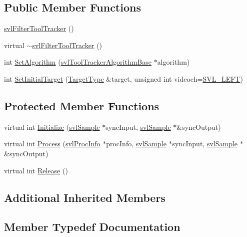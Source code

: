 \subsection*{Public Member Functions}
\begin{DoxyCompactItemize}
\item 
\hyperlink{classsvl_filter_tool_tracker_a442bd4bbe942d63139f1728da7247a30}{svl\+Filter\+Tool\+Tracker} ()
\item 
virtual \hyperlink{classsvl_filter_tool_tracker_a887c017972cd0ca96503fb6c4bd77ed0}{$\sim$svl\+Filter\+Tool\+Tracker} ()
\item 
int \hyperlink{classsvl_filter_tool_tracker_a6deaa24cb8bc7e37f128800e5ce4ac97}{Set\+Algorithm} (\hyperlink{classsvl_tool_tracker_algorithm_base}{svl\+Tool\+Tracker\+Algorithm\+Base} $\ast$algorithm)
\item 
int \hyperlink{classsvl_filter_tool_tracker_a4ce5ff7a3efe30b0347dab41b39dda38}{Set\+Initial\+Target} (\hyperlink{classsvl_filter_tool_tracker_a3fe48b9f9a53caf0f5df9e96b1ccc38e}{Target\+Type} \&target, unsigned int videoch=\hyperlink{svl_definitions_8h_ab9fec7615f19c8df2919eebcab0b187f}{S\+V\+L\+\_\+\+L\+E\+F\+T})
\end{DoxyCompactItemize}
\subsection*{Protected Member Functions}
\begin{DoxyCompactItemize}
\item 
virtual int \hyperlink{classsvl_filter_tool_tracker_ad71ff49f9538f8f34ef57deb1d8f34a6}{Initialize} (\hyperlink{classsvl_sample}{svl\+Sample} $\ast$sync\+Input, \hyperlink{classsvl_sample}{svl\+Sample} $\ast$\&sync\+Output)
\item 
virtual int \hyperlink{classsvl_filter_tool_tracker_a33c461cf76f3c09f50493a98bdb9dd6e}{Process} (\hyperlink{structsvl_proc_info}{svl\+Proc\+Info} $\ast$proc\+Info, \hyperlink{classsvl_sample}{svl\+Sample} $\ast$sync\+Input, \hyperlink{classsvl_sample}{svl\+Sample} $\ast$\&sync\+Output)
\item 
virtual int \hyperlink{classsvl_filter_tool_tracker_aec6f87e6e3d575fd0f990a0c4c66269f}{Release} ()
\end{DoxyCompactItemize}
\subsection*{Additional Inherited Members}


\subsection{Member Typedef Documentation}
\hypertarget{classsvl_filter_tool_tracker_a3fe48b9f9a53caf0f5df9e96b1ccc38e}{}
